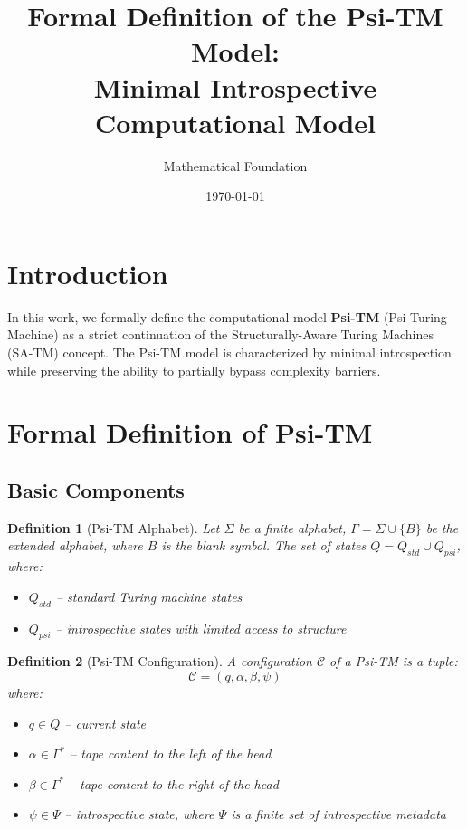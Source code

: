 \documentclass[11pt]{article}
\title{Formal Definition of the Psi-TM Model:\\
Minimal Introspective Computational Model}
\author{Mathematical Foundation}
\date{\today}
\newtheorem{definition}{Definition}
\begin{document}
\maketitle

\section{Introduction}

In this work, we formally define the computational model \textbf{Psi-TM} (Psi-Turing Machine) as a strict continuation of the Structurally-Aware Turing Machines (SA-TM) concept. The Psi-TM model is characterized by minimal introspection while preserving the ability to partially bypass complexity barriers.

\section{Formal Definition of Psi-TM}

\subsection{Basic Components}

\begin{definition}[Psi-TM Alphabet]
Let $\Sigma$ be a finite alphabet, $\Gamma = \Sigma \cup \{B\}$ be the extended alphabet, where $B$ is the blank symbol. The set of states $Q = Q_{std} \cup Q_{psi}$, where:
\begin{itemize}
\item $Q_{std}$ -- standard Turing machine states
\item $Q_{psi}$ -- introspective states with limited access to structure
\end{itemize}
\end{definition}

\begin{definition}[Psi-TM Configuration]
A configuration $\mathcal{C}$ of a Psi-TM is a tuple:
$$\mathcal{C} = (q, \alpha, \beta, \psi)$$
where:
\begin{itemize}
\item $q \in Q$ -- current state
\item $\alpha \in \Gamma^*$ -- tape content to the left of the head
\item $\beta \in \Gamma^*$ -- tape content to the right of the head
\item $\psi \in \Psi$ -- introspective state, where $\Psi$ is a finite set of introspective metadata
\end{itemize}
\end{definition}
\end{document}
